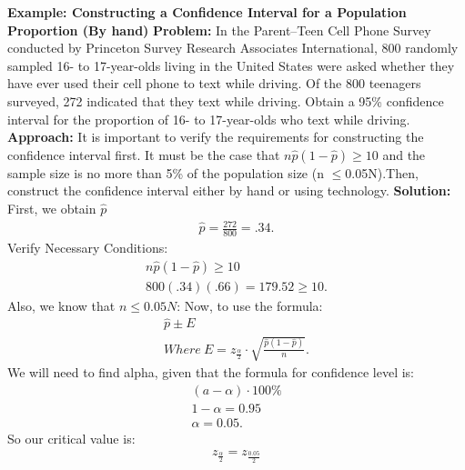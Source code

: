 \documentclass{report}
\begin{document}
        \begin{mdframed}
        \textbf{Example: Constructing a Confidence Interval for a Population Proportion (By hand)}
        \bigbreak \noindent 
        \textbf{Problem:}
        In the Parent–Teen Cell Phone Survey conducted by Princeton Survey Research Associates International, 800 randomly sampled 16- to 17-year-olds living in the United States were asked whether they have ever used their cell phone to text while driving. Of the 800 teenagers surveyed, 272 indicated that they text while driving. Obtain a 95\% confidence interval for the proportion of 16- to 17-year-olds who text while driving.
        \bigbreak \noindent 
        \textbf{Approach:}
        It is important to verify the requirements for constructing the confidence interval first. It must be the case that $n\hat{p}(1 −\hat{p}) \geq 10$ and the sample size is no more than 5\% of the population size (n $ \leq $0.05N).Then, construct the confidence interval either by hand or using technology.
        \bigbreak \noindent 
        \textbf{Solution:}
        \bigbreak \noindent 
        First, we obtain $\hat{p} $
        \begin{align*}
            \hat{p} = \frac{272}{800} = .34
        .\end{align*}
        \bigbreak \noindent 
        Verify Necessary Conditions:
        \begin{align*}
           n\hat{p}(1-\hat{p})  \geq 10 \\
            800(.34)(.66) = 179.52 \geq 10
        .\end{align*}
        \bigbreak \noindent 
        Also, we know that $n \leq0.05N $:
        \bigbreak \noindent 
        Now, to use the formula:
        \begin{align*}
            \hat{p} \pm E \\
        Where\ E = z_{\frac{\alpha}{2}} \cdot \sqrt{\frac{\hat{p}(1-\hat{p})}{n}}
        .\end{align*}
        We will need to find alpha, given that the formula for confidence level is:
        \begin{align*}
            (a-\alpha) \cdot 100\% \\
            1- \alpha = 0.95 \\
            \alpha = 0.05
        .\end{align*}
        \bigbreak \noindent 
        So our critical value is:
        \begin{align*}
            z_{\frac{\alpha}{2}} = z_{\frac{0.05}{2}} \\

\end{align*}
\end{mdframed}
\end{document}
